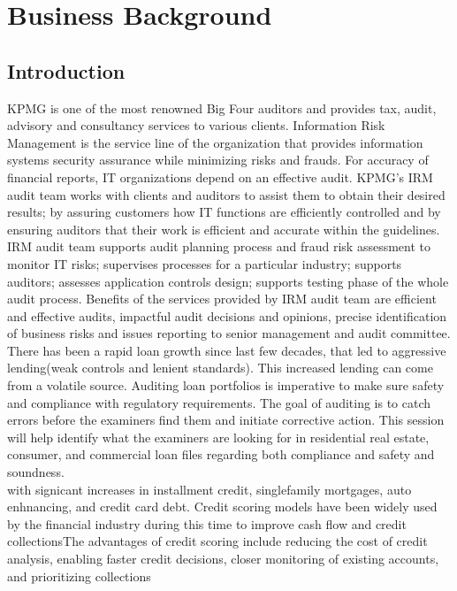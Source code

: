 %
%
%
%

\chapter{Business Background}\label{C.Business.Background}

\section{Introduction}\label{S.intro2}
KPMG is one of the most renowned Big Four auditors and provides tax, audit, advisory and consultancy services to various clients. Information Risk Management is the service line of the organization that provides information systems security assurance while minimizing risks and frauds. For accuracy of financial reports, IT organizations depend on an effective audit. KPMG's IRM audit team works with clients and auditors to assist them to obtain their desired results; by assuring customers how IT functions are efficiently controlled and by ensuring auditors that their work is efficient and accurate within the guidelines. IRM audit team supports audit planning process and fraud risk assessment to monitor IT risks; supervises processes for a particular industry; supports auditors; assesses application controls design; supports testing phase of the whole audit process. Benefits of the services provided by IRM audit team are efficient and effective audits, impactful audit decisions and opinions, precise identification of business risks and issues reporting to senior management and audit committee.\\

There has been a rapid loan growth since last few decades, that led to aggressive lending(weak controls and lenient standards). This increased lending can come from a volatile source. Auditing loan portfolios is imperative to make sure safety and compliance with regulatory requirements. 
The goal of auditing is to catch errors before the examiners find them and initiate corrective action. This session will help identify what the examiners are looking for in residential real estate, consumer, and commercial loan files regarding both compliance and safety and soundness.\\

with signicant increases in installment credit, singlefamily mortgages, auto enhnancing, and credit card debt. Credit scoring models have been widely used by the financial industry during this time to improve cash flow and credit collectionsThe advantages of credit scoring include reducing the cost of credit analysis, enabling faster credit decisions, closer monitoring of existing accounts, and prioritizing collections
 